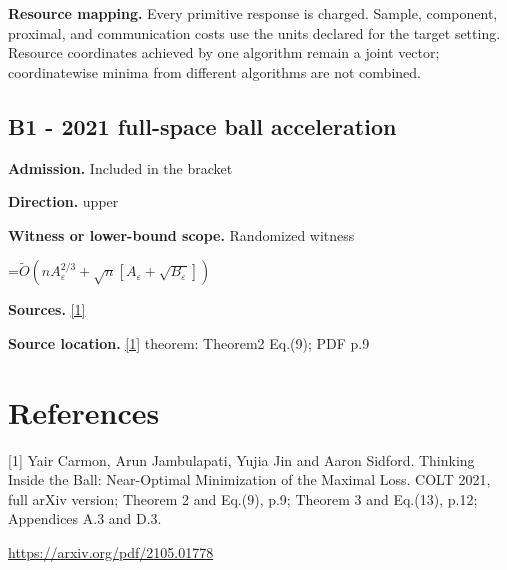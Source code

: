 \documentclass[10pt,a4paper]{article}
\newcommand{\AtlasMath}[1]{\par\begingroup\centering\setbox0=\hbox{$\displaystyle #1$}\ifdim\wd0>1.4\linewidth\typeout{ATLAS WIDE FORMULA: \the\wd0}\fi\ifdim\wd0>\linewidth\resizebox{\linewidth}{!}{\box0}\else\box0\fi\par\endgroup}
\begin{document}
\textbf{Resource mapping.} Every primitive response is charged. Sample, component, proximal, and communication costs use the units declared for the target setting. Resource coordinates achieved by one algorithm remain a joint vector; coordinatewise minima from different algorithms are not combined.

\subsection{B1 - 2021 full-space ball acceleration}
\textbf{Admission.} Included in the bracket

\textbf{Direction.} upper

\textbf{Witness or lower-bound scope.} Randomized witness

\AtlasMath{\widetilde{O}(nA_\varepsilon^{2/3}+\sqrt n[A_\varepsilon+\sqrt{B_\varepsilon}])}
\textbf{Sources.} \href{https://arxiv.org/pdf/2105.01778}{[1]}

\textbf{Source location.} \href{https://arxiv.org/pdf/2105.01778}{[1]} theorem: Theorem2 Eq.(9); PDF p.9

\section{References}
[1] Yair Carmon, Arun Jambulapati, Yujia Jin and Aaron Sidford. Thinking Inside the Ball: Near-Optimal Minimization of the Maximal Loss. COLT 2021, full arXiv version; Theorem 2 and Eq.(9), p.9; Theorem 3 and Eq.(13), p.12; Appendices A.3 and D.3.

\url{https://arxiv.org/pdf/2105.01778}
\end{document}
